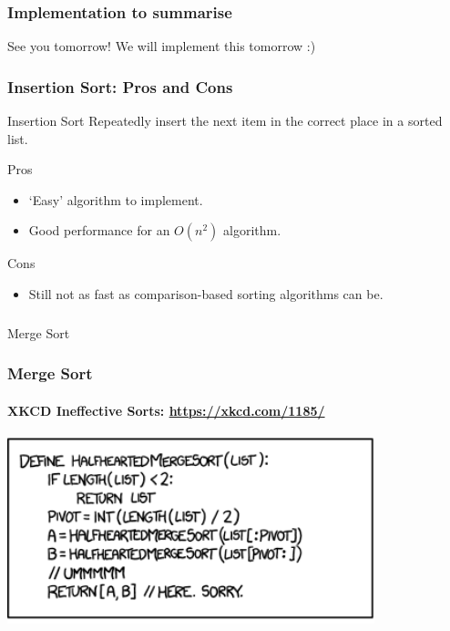 \begin{frame}
	\frametitle{Implementation to summarise}
	
		\begin{block}{See you tomorrow!}
			We will implement this tomorrow :)
		\end{block}	
\end{frame}

\begin{frame}
	\frametitle{Insertion Sort: Pros and Cons}
		\begin{block}{Insertion Sort}
			Repeatedly insert the next item in the correct place in a sorted list.
		\end{block}	
		\begin{block}{Pros}
			\begin{itemize}
				\item `Easy' algorithm to implement.
				\item Good performance for an $O(n^2)$ algorithm.
			\end{itemize}
		\end{block}	
		\begin{block}{Cons}
			\begin{itemize}
				\item Still not as fast as comparison-based sorting algorithms can be.
			\end{itemize}
		\end{block}	
	
\end{frame}

\begin{frame}[fragile]\frametitle{}
\begin{center}
{\Large Merge Sort}
\end{center}

\end{frame}

\begin{frame}
	\frametitle{Merge Sort}
	\framesubtitle{XKCD Ineffective Sorts: \url{https://xkcd.com/1185/}}
	\begin{center}
		\includegraphics[width=0.8\textwidth]{images/mergesort.png}\\
	\end{center}
\end{frame}

